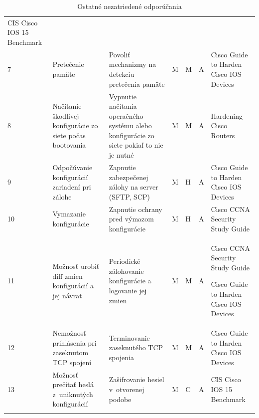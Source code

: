 \begin{longtable}[!htbp]{|C{2.5em}L{9em}L{9em}C{2em}C{2.5em}C{7.5em}L{10em}|}
	CIS Cisco IOS 15 Benchmark \cite{CIS_DrTLsgXv24lxeIIM}\\
	 7	&Pretečenie pamäte	&Povoliť mechanizmy na detekciu pretečenia pamäte	&M	&M	&A	&Cisco Guide to Harden Cisco IOS Devices \cite{Singh2018}\\
	8	&Načítanie škodlivej konfigurácie zo siete počas bootovania	&Vypnutie načítania operačného systému alebo konfigurácie zo siete pokiaľ to nie je nutné	&M	&M	&A	&Hardening Cisco Routers \cite{Akin2002}\\
	 9	&Odpočúvanie konfigurácií zariadení pri zálohe	&Zapnutie zabezpečenej zálohy na server (SFTP, SCP)	&M	&H	&A	&Cisco Guide to Harden Cisco IOS Devices \cite{Singh2018}\\
	10	&Vymazanie konfigurácie	&Zapnutie ochrany pred výmazom konfigurácie	&M	&H	&A	&Cisco CCNA Security Study Guide \cite{McMillan2018}\\
	 11	&Možnosť urobiť diff zmien konfigurácií a jej návrat	&Periodické zálohovanie konfigurácie a logovanie jej zmien	&M	&M	&A	&Cisco CCNA Security Study Guide \cite{McMillan2018}
	
	Cisco Guide to Harden Cisco IOS Devices \cite{Singh2018}\\
	12	&Nemožnosť prihlásenia pri zaseknutom TCP spojení	&Terminovanie zaseknutého TCP spojenia	&M	&M	&A	&Cisco Guide to Harden Cisco IOS Devices \cite{Singh2018}\\
	 13	&Možnosť prečítať heslá z~uniknutých konfigurácií	&Zašifrovanie hesiel v~otvorenej podobe	&M	&C	&A	&CIS Cisco IOS 15 Benchmark \cite{CIS_DrTLsgXv24lxeIIM}\\
	
	\hline
	\caption{Ostatné nezatriedené odporúčania}
	\label{tab:other}%
\end{longtable}%






\restoregeometry 
\normalsize

